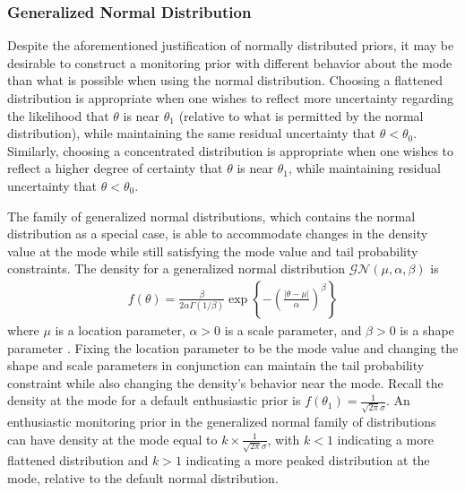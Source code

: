 \documentclass[12pt]{article}
\begin{document}
\subsubsection{Generalized Normal Distribution}\label{sec:gen_normal}
Despite the aforementioned justification of normally distributed priors, it may be desirable to construct a monitoring prior with different behavior about the  mode than what is possible when using the normal distribution. 
%
Choosing a flattened distribution is appropriate {when one wishes to reflect more uncertainty regarding the likelihood that 
$\theta$ is near $\theta_1$ (relative to what is permitted by the normal distribution), while maintaining the same residual uncertainty 
that $\theta<\theta_0$}. 
%
Similarly, choosing a concentrated distribution is appropriate {when one wishes to reflect} a higher 
degree of certainty that $\theta$ is near $\theta_1$, while maintaining residual uncertainty that $\theta<\theta_0$. 
%

The family of generalized normal distributions, which contains the normal distribution as a special case, is able to accommodate changes in the density value at the mode while still satisfying the mode value and tail probability constraints. 
%
The density for a generalized normal distribution $\mathcal{GN}(\mu,\alpha,\beta)$ is
\begin{align*}
f(\theta)=\frac{\beta}{2\alpha\Gamma(1/\beta)}\exp\left\{-\left(\frac{|\theta-\mu|}{\alpha}\right)^\beta\right\}
\end{align*} where $\mu$ is a location parameter, $\alpha>0$ is a scale parameter, and $\beta>0$ is a shape parameter \citep{Nadarajah2005}. Fixing the location parameter to be the mode value and changing the shape and scale parameters in conjunction can maintain the tail probability constraint while also changing the density's behavior near the mode. 
%
Recall the density at the mode for a default enthusiastic prior is $f(\theta_1)=\frac{1}{\sqrt{2\pi}\sigma}$. 
%
An enthusiastic monitoring prior in the generalized normal family of distributions can have density at the mode equal to $k\times \frac{1}{\sqrt{2\pi}\sigma}$, with $k<1$ indicating a more flattened distribution and $k>1$ indicating a more peaked distribution at the mode, relative to the default normal distribution. 
%
%
\end{document}
